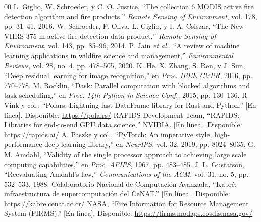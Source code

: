 \documentclass[conference]{IEEEtran}
\begin{document}
\begin{thebibliography}{00}
 L. Giglio, W. Schroeder, y C. O. Justice, ``The collection 6 MODIS active fire detection algorithm and fire products,'' \textit{Remote Sensing of Environment}, vol. 178, pp. 31--41, 2016.
 W. Schroeder, P. Oliva, L. Giglio, y I. A. Csiszar, ``The New VIIRS 375 m active fire detection data product,'' \textit{Remote Sensing of Environment}, vol. 143, pp. 85--96, 2014.
 P. Jain \textit{et al.}, ``A review of machine learning applications in wildfire science and management,'' \textit{Environmental Reviews}, vol. 28, no. 4, pp. 478--505, 2020.
 K. He, X. Zhang, S. Ren, y J. Sun, ``Deep residual learning for image recognition,'' en \textit{Proc. IEEE CVPR}, 2016, pp. 770--778.
 M. Rocklin, ``Dask: Parallel computation with blocked algorithms and task scheduling,'' en \textit{Proc. 14th Python in Science Conf.}, 2015, pp. 130--136.
 R. Vink y col., ``Polars: Lightning-fast DataFrame library for Rust and Python.'' [En línea]. Disponible: \url{https://pola.rs/}
 RAPIDS Development Team, ``RAPIDS: Libraries for end-to-end GPU data science,'' NVIDIA. [En línea]. Disponible: \url{https://rapids.ai/}
 A. Paszke y col., ``PyTorch: An imperative style, high-performance deep learning library,'' en \textit{NeurIPS}, vol. 32, 2019, pp. 8024--8035.
 G. M. Amdahl, ``Validity of the single processor approach to achieving large scale computing capabilities,'' en \textit{Proc. AFIPS}, 1967, pp. 483--485.
 J. L. Gustafson, ``Reevaluating Amdahl's law,'' \textit{Communications of the ACM}, vol. 31, no. 5, pp. 532--533, 1988.
 Colaboratorio Nacional de Computación Avanzada, ``Kabré: infraestructura de supercomputación del CeNAT.'' [En línea]. Disponible: \url{https://kabre.cenat.ac.cr/}
 NASA, ``Fire Information for Resource Management System (FIRMS).'' [En línea]. Disponible: \url{https://firms.modaps.eosdis.nasa.gov/}
\end{thebibliography}
\end{document}
